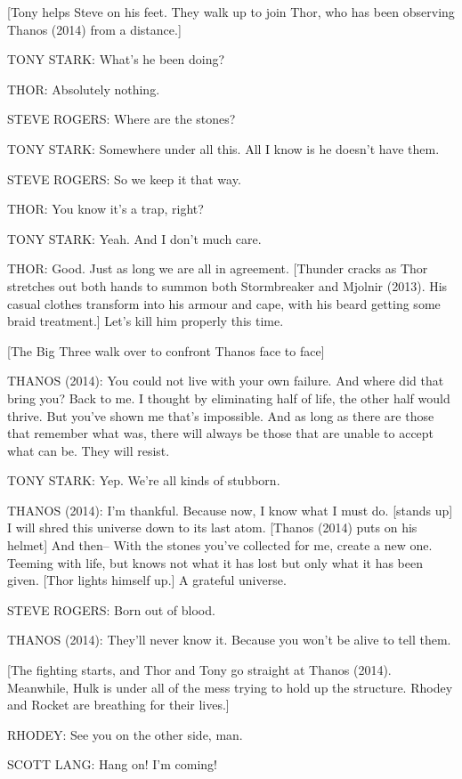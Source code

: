 [Tony helps Steve on his feet. They walk up to join Thor, who has been observing Thanos (2014) from a distance.]

TONY STARK: What's he been doing?

THOR: Absolutely nothing.

STEVE ROGERS: Where are the stones?

TONY STARK: Somewhere under all this. All I know is he doesn't have them.

STEVE ROGERS: So we keep it that way.

THOR: You know it's a trap, right?

TONY STARK: Yeah. And I don't much care.

THOR: Good. Just as long we are all in agreement. [Thunder cracks as Thor stretches out both hands to summon both Stormbreaker and Mjolnir (2013). His casual clothes transform into his armour and cape, with his beard getting some braid treatment.] Let's kill him properly this time.

[The Big Three walk over to confront Thanos face to face]

THANOS (2014): You could not live with your own failure. And where did that bring you? Back to me. I thought by eliminating half of life, the other half would thrive. But you’ve shown me that’s impossible. And as long as there are those that remember what was, there will always be those that are unable to accept what can be. They will resist.

TONY STARK: Yep. We're all kinds of stubborn.

THANOS (2014): I'm thankful. Because now, I know what I must do. [stands up] I will shred this universe down to its last atom. [Thanos (2014) puts on his helmet] And then– With the stones you've collected for me, create a new one. Teeming with life, but knows not what it has lost but only what it has been given. [Thor lights himself up.] A grateful universe.

STEVE ROGERS: Born out of blood.

THANOS (2014): They'll never know it. Because you won't be alive to tell them.

[The fighting starts, and Thor and Tony go straight at Thanos (2014). Meanwhile, Hulk is under all of the mess trying to hold up the structure. Rhodey and Rocket are breathing for their lives.]

RHODEY: See you on the other side, man.

SCOTT LANG: Hang on! I'm coming!

